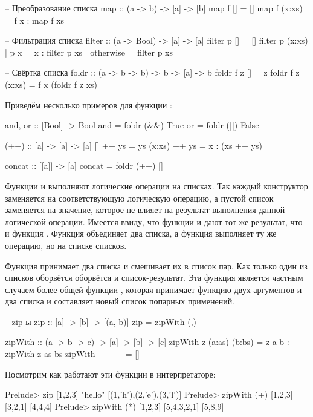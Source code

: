 \begin{code}
-- Преобразование списка
map :: (a -> b) -> [a] -> [b]
map f []     = []
map f (x:xs) = f x : map f xs

-- Фильтрация списка
filter :: (a -> Bool) -> [a] -> [a]
filter p []                 = []
filter p (x:xs) | p x       = x : filter p xs
                | otherwise = filter p xs

-- Свёртка списка
foldr            :: (a -> b -> b) -> b -> [a] -> b
foldr f z []     =  z
foldr f z (x:xs) =  f x (foldr f z xs)
\end{code}

Приведём несколько примеров для функции :


\begin{code}
and, or :: [Bool] -> Bool
and = foldr (&&) True
or  = foldr (||) False

(++) :: [a] -> [a] -> [a]
[]     ++ ys = ys
(x:xs) ++ ys = x : (xs ++ ys)
    
concat :: [[a]] -> [a]
concat = foldr (++) []
\end{code}

Функции  и  выполняют логические операции на списках. Так
каждый конструктор \In{(:)} заменяется на соответствующую логическую
операцию, а пустой список заменяется на значение, которое не влияет на
результат выполнения данной логической операции. Имеется ввиду, что
функции  и  дают тот же результат, что и
функция . Функция \In{(++)} объединяет два списка, а
функция  выполняет ту же операцию, но на списке списков.

Функция  принимает два списка и смешивает их в список пар. Как
только один из списков оборвётся оборвётся и список-результат. Эта
функция является частным случаем более общей функции ,
которая принимает функцию двух аргументов и два списка и составляет
новый список попарных применений.


\begin{code}
-- zip-ы 
zip :: [a] -> [b] -> [(a, b)]
zip = zipWith (,)

zipWith :: (a -> b -> c) -> [a] -> [b] -> [c]
zipWith z (a:as) (b:bs) =  z a b : zipWith z as bs
zipWith _ _ _           =  []
\end{code}

Посмотрим как работают эти функции в интерпретаторе:


\begin{code}
Prelude> zip [1,2,3] "hello"
[(1,'h'),(2,'e'),(3,'l')]
Prelude> zipWith (+) [1,2,3] [3,2,1]
[4,4,4]
Prelude> zipWith (*) [1,2,3] [5,4,3,2,1]
[5,8,9]
\end{code}

